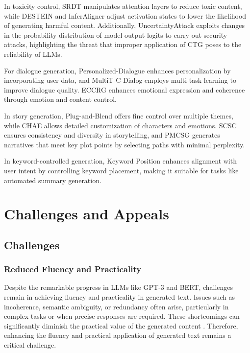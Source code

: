 \documentclass[acmsmall, screen]{acmart}
\begin{document}
In toxicity control, SRDT\cite{leong_acl23_SRDT} manipulates attention layers to reduce toxic content, while DESTEIN\cite{li_arxiv24_DESTEIN} and InferAligner\cite{wang_arxiv24_InferAligner} adjust activation states to lower the likelihood of generating harmful content.
Additionally, UncertaintyAttack\cite{zeng_arxiv24_UncertaintyAttack} exploits changes in the probability distribution of model output logits to carry out security attacks, highlighting the threat that improper application of CTG poses to the reliability of LLMs.

For dialogue generation, Personalized-Dialogue\cite{zheng_aaai20_Personalized-Dialogue} enhances personalization by incorporating user data, and MultiT-C-Dialog\cite{zeng_-naacl21_MultiT-C-Dialog} employs multi-task learning to improve dialogue quality. ECCRG\cite{chen_2024_ECCRG} enhances emotional expression and coherence through emotion and content control.

In story generation, Plug-and-Blend\cite{lin_nuse21_PlugandBlend} offers fine control over multiple themes, while CHAE\cite{wang_coling22_CHAE} allows detailed customization of characters and emotions. SCSC\cite{cho_www22_SCSC} ensures consistency and diversity in storytelling, and PMCSG\cite{Vychegzhanin_2024_PMCSG} generates narratives that meet key plot points by selecting paths with minimal perplexity.

In keyword-controlled generation, Keyword Position\cite{sasazawa_siggen23_KeywordPosition} enhances alignment with user intent by controlling keyword placement, making it suitable for tasks like automated summary generation.

\section{Challenges and Appeals}
\label{sec:ctg_c&a}

\subsection{Challenges}

\subsubsection{\textbf{Reduced Fluency and Practicality}}
Despite the remarkable progress in LLMs like GPT-3 and BERT, challenges remain in achieving fluency and practicality in generated text. Issues such as incoherence, semantic ambiguity, or redundancy often arise, particularly in complex tasks or when precise responses are required. These shortcomings can significantly diminish the practical value of the generated content \cite{zhong_acl23_Air-Decoding,liang_arxiv24_DATG}. Therefore, enhancing the fluency and practical application of generated text remains a critical challenge.
\end{document}
